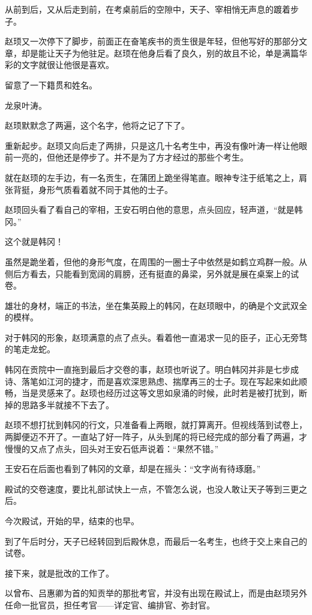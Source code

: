 从前到后，又从后走到前，在考桌前后的空隙中，天子、宰相悄无声息的踱着步子。

赵顼又一次停下了脚步，前面正在奋笔疾书的贡生很是年轻，但他写好的那部分文章，却是能让天子为他驻足。赵顼在他身后看了良久，别的故且不论，单是满篇华彩的文字就很让他很是喜欢。

留意了一下籍贯和姓名。

龙泉叶涛。

赵顼默默念了两遍，这个名字，他将之记了下了。

重新起步。赵顼又向后走了两排，只是这几十名考生中，再没有像叶涛一样让他眼前一亮的，但他还是停步了。并不是为了方才经过的那些个考生。

就在赵顼的左手边，有一名贡生，在蒲团上跪坐得笔直。眼神专注于纸笔之上，肩张背挺，身形气质看着就不同于其他的士子。

赵顼回头看了看自己的宰相，王安石明白他的意思，点头回应，轻声道，“就是韩冈。”

这个就是韩冈！

虽然是跪坐着，但他的身形气度，在周围的一圈士子中依然是如鹤立鸡群一般。从侧后方看去，只能看到宽阔的肩膀，还有挺直的鼻梁，另外就是展在桌案上的试卷。

雄壮的身材，端正的书法，坐在集英殿上的韩冈，在赵顼眼中，的确是个文武双全的模样。

对于韩冈的形象，赵顼满意的点了点头。看着他一直渴求一见的臣子，正心无旁骛的笔走龙蛇。

韩冈在贡院中一直拖到最后才交卷的事，赵顼也听说了。明白韩冈并非是七步成诗、落笔如江河的捷才，而是喜欢深思熟虑、揣摩再三的士子。现在写起来如此顺畅，当是灵感来了。赵顼也经历过这等文思如泉涌的时候，此时若是被打扰到，断掉的思路多半就接不下去了。

赵顼不想打扰到韩冈的行文，只准备看上两眼，就打算离开。但视线落到试卷上，两脚便迈不开了。一直站了好一阵子，从头到尾的将已经完成的部分看了两遍，才慢慢的又点了点头，回头对王安石低声说着：“果然不错。”

王安石在后面也看到了韩冈的文章，却是在摇头：“文字尚有待琢磨。”

殿试的交卷速度，要比礼部试快上一点，不管怎么说，也没人敢让天子等到三更之后。

今次殿试，开始的早，结束的也早。

到了午后时分，天子已经转回到后殿休息，而最后一名考生，也终于交上来自己的试卷。

接下来，就是批改的工作了。

以曾布、吕惠卿为首的知贡举的那批考官，并没有出现在殿试上，而是由赵顼另外任命一批官员，担任考官——详定官、编排官、弥封官。

